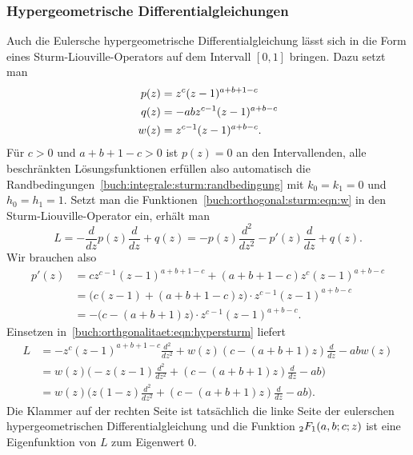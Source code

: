 \subsubsection{Hypergeometrische Differentialgleichungen}
Auch die Eulersche hypergeometrische Differentialgleichung
%
%
lässt sich in die Form eines Sturm-Liouville-Operators
auf dem Intervall $[0,1]$
%
bringen.
Dazu setzt man
\begin{equation}
\begin{aligned}
p(z)
&=
z^c(z-1)^{a+b+1-c}
\notag
\\
q(z)
&=
-abz^{c-1}(z-1)^{a+b-c}
\notag
\\
w(z)
&=
z^{c-1}(z-1)^{a+b-c}.
\end{aligned}
\label{buch:orthogonal:sturm:eqn:w}
\end{equation}
Für $c>0$ und $a+b+1-c>0$ ist $p(z)=0$ an den Intervallenden,
alle beschränkten Lösungsfunktionen erfüllen also automatisch die
Randbedingungen~\eqref{buch:integrale:sturm:randbedingung}
mit $k_0=k_1=0$ und $h_0=h_1=1$.
Setzt man die Funktionen~\eqref{buch:orthogonal:sturm:eqn:w}
in den Sturm-Liouville-Operator ein, erhält man
\begin{equation}
L
=
-\frac{d}{dz}p(z)\frac{d}{dz} + q(z)
=
-p(z)\frac{d^2}{dz^2}
-p'(z)\frac{d}{dz}
+q(z).
\label{buch:orthgonalitaet:eqn:hypersturm}
\end{equation}
Wir brauchen also
\begin{align*}
p'(z)
&=
cz^{c-1}(z-1)^{a+b+1-c}
+
(a+b+1-c)
z^c
(z-1)^{a+b-c}
\\
&=
\bigl(
c(z-1)+
(a+b+1-c)z
\bigr)
\cdot
z^{c-1}(z-1)^{a+b-c}
\\
&=
-
\bigl(
c-(a+b+1)z
\bigr)
\cdot
z^{c-1}(z-1)^{a+b-c}.
\end{align*}
Einsetzen in~\eqref{buch:orthgonalitaet:eqn:hypersturm} liefert
\begin{align*}
L
&=
-z^c(z-1)^{a+b+1-c} \frac{d^2}{dz^2}
+
w(z)
(c-(a+b+1)z)
\frac{d}{dz}
-
abw(z)
\\
&=
w(z)
\biggl(
-
z(z-1)
\frac{d^2}{dz^2}
+
(c-(a+b+1)z)
\frac{d}{dz}
-ab
\biggr)
\\
&=
w(z)
\biggl(
z(1-z)
\frac{d^2}{dz^2}
+
(c-(a+b+1)z)
\frac{d}{dz}
-ab
\biggr).
\end{align*}
Die Klammer auf der rechten Seite ist tatsächlich die linke Seite der
eulerschen hypergeometrischen Differentialgleichung und
die Funktion $\mathstrut_2F_1(a,b;c;z)$ ist eine Eigenfunktion
von $L$ zum Eigenwert $0$.

